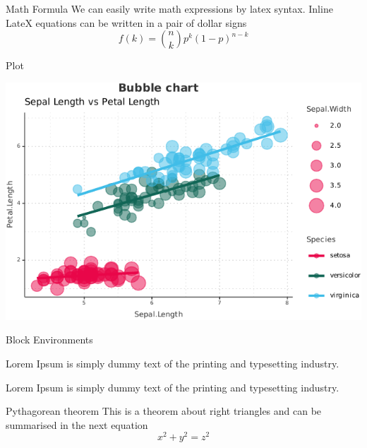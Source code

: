 \documentclass[10pt,ignorenonframetext,]{beamer}
\newenvironment{rmdThink}{
\begin{tcolorbox}[enhanced, title={\textbf{\color{white}Think}},colback=MPIGreen!10!white, colframe=MPIGreen,boxrule=0.2mm]}{
\end{tcolorbox}}
\begin{document}
\begin{frame}{Math Formula}
\protect\hypertarget{math-formula}{}
We can easily write math expressions by latex syntax. Inline LateX
equations can be written in a pair of dollar signs
\[f\left(k\right)=\binom{n}{k}p^k\left(1-p\right)^{n-k}\]
\end{frame}

\begin{frame}{Plot}
\protect\hypertarget{plot}{}
\begin{center}\includegraphics{figure/scatterPlot-1} \end{center}
\end{frame}

\begin{frame}{Block Environments}
\protect\hypertarget{block-environments}{}
\begin{rmdThink}
Lorem Ipsum is simply dummy text of the printing and typesetting
industry.

\end{rmdThink}

\begin{rmdthink}
Lorem Ipsum is simply dummy text of the printing and typesetting
industry.

\end{rmdthink}

\begin{Theorem}{Pythagorean theorem}
This is a theorem about right triangles and can be summarised in the
next equation \[ x^2 + y^2 = z^2 \]

\end{Theorem}
\end{frame}
\end{document}
